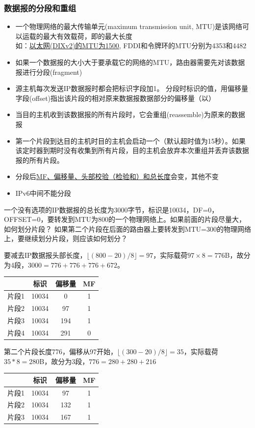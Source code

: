 \subsubsection{数据报的分段和重组}
\begin{itemize}
\item 一个物理网络的最大传输单元(maximum transmission unit, MTU)是该网络可以运载的最大有效载荷，即的最大长度\\
如：\underline{以太网(DIXv2)的MTU为1500}, FDDI和令牌环的MTU分别为4353和4482
\item 如果一个数据报的大小大于要承载它的网络的MTU，路由器需要先对该数据报进行分段(fragment)
\item 源主机每次发送IP数据报时都会把标识字段加1。
分段时标识的值，用偏移量字段(offset)指出该片段的相对原来数据报数据部分的偏移量（以）
\item 当目的主机收到该数据报的所有片段时，它会重组(reassemble)为原来的数据报
\item 第一个片段到达目的主机时目的主机会启动一个（默认超时值为15秒）。如果该定时器到期时没有收集到所有片段，目的主机会放弃本次重组并丢弃该数据报的所有片段。
\item 分段后\underline{MF、偏移量、头部校验（检验和）和总长度}会变，其他不变
\item IPv6中间不能分段
\end{itemize}
\begin{example}
	一个没有选项的IP数据报的总长度为3000字节，标识是10034，DF=0，OFFSET=0，要转发到MTU为800的一个物理网络上。如果前面的片段尽量大，如何划分片段？
	如果第二个片段在后面的路由器上要转发到MTU=300的物理网络上，要继续划分片段，则应该如何划分？
\end{example}
\begin{analysis}
	要减去IP数据报头部长度，$\lfloor (800-20)/8\rfloor=97$，实际载荷$97\times 8=776$B，故分为4段，$3000=776+776+776+672$。
\begin{center}
\begin{tabular}{cccc}\hline
	& 标识 & 偏移量 & MF\\\hline
片段1 & 10034 & 0 & 1\\
片段2 & 10034 & 97 & 1\\
片段3 & 10034 & 194 & 1\\
片段4 & 10034 & 291 & 0\\\hline
\end{tabular}
\end{center}
	第二个片段长度776，偏移从97开始，$\lfloor(300-20)/8\rfloor=35$，实际载荷$35*8=280$B，故分为3段，$776=280+280+216$
\begin{center}
\begin{tabular}{cccc}\hline
	& 标识 & 偏移量 & MF\\\hline
片段1 & 10034 & 97 & 1\\
片段2 & 10034 & 132 & 1\\
片段3 & 10034 & 167 & 1\\\hline
\end{tabular}
\end{center}
\end{analysis}

